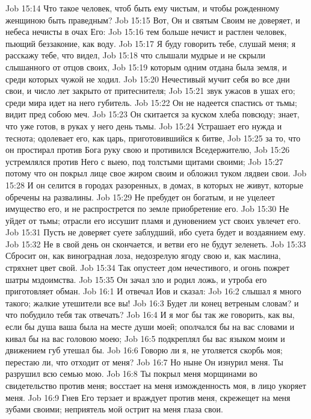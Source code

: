 \vs Job 15:14 Что такое человек, чтоб быть ему чистым, и чтобы рожденному женщиною быть праведным?
\vs Job 15:15 Вот, Он и святым Своим не доверяет, и небеса нечисты в очах Его:
\vs Job 15:16 тем больше нечист и растлен человек, пьющий беззаконие, как воду.
\vs Job 15:17 Я буду говорить тебе, слушай меня; я расскажу тебе, что видел,
\vs Job 15:18 что слышали мудрые и не скрыли слышанного от отцов своих,
\vs Job 15:19 которым одним отдана была земля, и среди которых чужой не ходил.
\vs Job 15:20 Нечестивый мучит себя во все дни свои, и число лет закрыто от притеснителя;
\vs Job 15:21 звук ужасов в ушах его; среди мира идет на него губитель.
\vs Job 15:22 Он не надеется спастись от тьмы; видит пред собою меч.
\vs Job 15:23 Он скитается за куском хлеба повсюду; знает, что уже готов, в руках у него день тьмы.
\vs Job 15:24 Устрашает его нужда и теснота; одолевает его, как царь, приготовившийся к битве,
\vs Job 15:25 за то, что он простирал против Бога руку свою и противился Вседержителю,
\vs Job 15:26 устремлялся против Него с  выею, под толстыми щитами своими;
\vs Job 15:27 потому что он покрыл лице свое жиром своим и обложил туком лядвеи свои.
\vs Job 15:28 И он селится в городах разоренных, в домах, в которых не живут, которые обречены на развалины.
\vs Job 15:29 Не пребудет он богатым, и не уцелеет имущество его, и не распрострется по земле приобретение его.
\vs Job 15:30 Не уйдет от тьмы; отрасли его иссушит пламя и дуновением уст своих увлечет его.
\vs Job 15:31 Пусть не доверяет суете заблудший, ибо суета будет и воздаянием ему.
\vs Job 15:32 Не в свой день он скончается, и ветви его не будут зеленеть.
\vs Job 15:33 Сбросит он, как виноградная лоза, недозрелую ягоду свою и, как маслина, стряхнет цвет свой.
\vs Job 15:34 Так опустеет дом нечестивого, и огонь пожрет шатры мздоимства.
\vs Job 15:35 Он зачал зло и родил ложь, и утроба его приготовляет обман.
\vs Job 16:1 И отвечал Иов и сказал:
\vs Job 16:2 слышал я много такого; жалкие утешители все вы!
\vs Job 16:3 Будет ли конец ветреным словам? и что побудило тебя так отвечать?
\vs Job 16:4 И я мог бы так же говорить, как вы, если бы душа ваша была на месте души моей; ополчался бы на вас словами и кивал бы на вас головою моею;
\vs Job 16:5 подкреплял бы вас языком моим и движением губ утешал бы.
\vs Job 16:6 Говорю ли я, не утоляется скорбь моя; перестаю ли, что отходит от меня?
\vs Job 16:7 Но ныне Он изнурил меня. Ты разрушил всю семью мою.
\vs Job 16:8 Ты покрыл меня морщинами во свидетельство против меня; восстает на меня изможденность моя, в лицо укоряет меня.
\vs Job 16:9 Гнев Его терзает и враждует против меня, скрежещет на меня зубами своими; неприятель мой острит на меня глаза свои.
